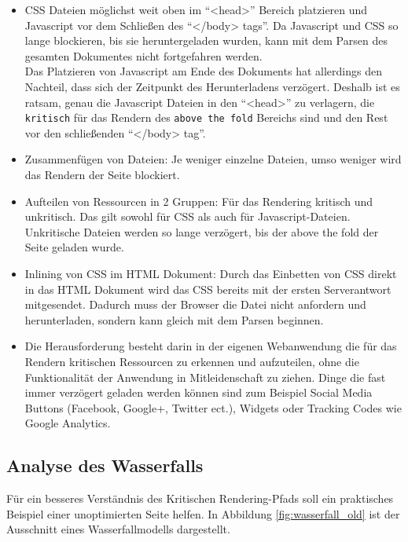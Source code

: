 			\begin{itemize}
				\item CSS Dateien möglichst weit oben im "`<head>"' Bereich platzieren und Javascript vor dem Schließen des "`</body> tags"'. Da Javascript und CSS so lange blockieren, bis sie heruntergeladen wurden, kann mit dem Parsen des gesamten Dokumentes nicht fortgefahren werden. \autocite{placingScripts}\\
				Das Platzieren von Javascript am Ende des Dokuments hat allerdings den Nachteil, dass sich der Zeitpunkt des Herunterladens verzögert. Deshalb ist es ratsam, genau die Javascript Dateien in den "`<head>"' zu verlagern, die \texttt{kritisch} für das Rendern des \texttt{above the fold} Bereichs sind und den Rest vor den schließenden "`</body> tag"'. 

				\item Zusammenfügen von Dateien: Je weniger einzelne Dateien, umso weniger wird das Rendern der Seite blockiert.

				\item Aufteilen von Ressourcen in 2 Gruppen: Für das Rendering kritisch und unkritisch. Das gilt sowohl für CSS als auch für Javascript-Dateien. Unkritische Dateien werden so lange verzögert, bis der above the fold der Seite geladen wurde.

				\item Inlining von CSS im HTML Dokument: Durch das Einbetten von CSS direkt in das HTML Dokument wird das CSS bereits mit der ersten Serverantwort mitgesendet. Dadurch muss der Browser die Datei nicht anfordern und herunterladen, sondern kann gleich mit dem Parsen beginnen.

				\item Die Herausforderung besteht darin in der eigenen Webanwendung die für das Rendern kritischen Ressourcen zu erkennen und aufzuteilen, ohne die Funktionalität der Anwendung in Mitleidenschaft zu ziehen. Dinge die fast immer verzögert geladen werden können sind zum Beispiel Social Media Buttons (Facebook, Google+, Twitter ect.), Widgets oder Tracking Codes wie Google Analytics.
			\end{itemize}


	\pagebreak

	\subsection{Analyse des Wasserfalls}
	\label{sub:analyse_des_wasserfalls}
		Für ein besseres Verständnis des Kritischen Rendering-Pfads soll ein praktisches Beispiel einer unoptimierten Seite helfen. In Abbildung \ref{fig:wasserfall_old} ist der Ausschnitt eines Wasserfallmodells dargestellt. 

